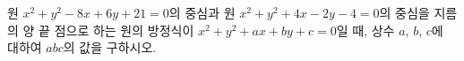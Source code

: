 원 $x^2+y^2-8x+6y+21=0$의 중심과 원 $x^2+y^2+4x-2y-4=0$의 중심을 지름의 양 끝 점으로 하는 원의 방정식이 $x^2+y^2+ax+by+c=0$일 때, 상수 $a$, $b$, $c$에 대하여 $abc$의 값을 구하시오.
